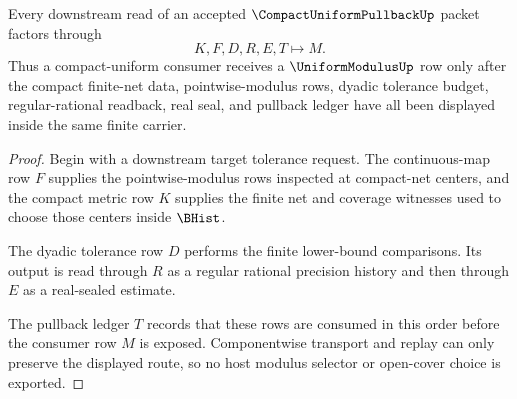 \begin{theorem}
\label{thm:compact-uniform-pullback-modulus-handoff}
Every downstream read of an accepted $\CompactUniformPullbackUp$ packet factors through
$$
K,F,D,R,E,T \longmapsto M .
$$
Thus a compact-uniform consumer receives a $\UniformModulusUp$ row only after the compact finite-net data, pointwise-modulus rows, dyadic tolerance budget, regular-rational readback, real seal, and pullback ledger have all been displayed inside the same finite carrier.
\end{theorem}
\begin{proof}
Begin with a downstream target tolerance request. The continuous-map row $F$ supplies the pointwise-modulus rows inspected at compact-net centers, and the compact metric row $K$ supplies the finite net and coverage witnesses used to choose those centers inside $\BHist$.

The dyadic tolerance row $D$ performs the finite lower-bound comparisons. Its output is read through $R$ as a regular rational precision history and then through $E$ as a real-sealed estimate.

The pullback ledger $T$ records that these rows are consumed in this order before the consumer row $M$ is exposed. Componentwise transport and replay can only preserve the displayed route, so no host modulus selector or open-cover choice is exported.
\end{proof}




